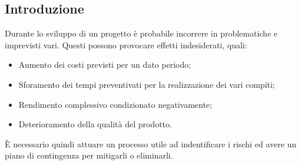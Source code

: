 \subsection{Introduzione}
    Durante lo sviluppo di un progetto è probabile incorrere in problematiche e imprevisti vari. Questi possono provocare effetti indesiderati, quali:
    \begin{itemize}
        \item Aumento dei costi previsti per un dato periodo; 
        \item Sforamento dei tempi preventivati per la realizzazione dei vari compiti; 
        \item Rendimento complessivo condizionato negativamente; 
        \item Deterioramento della qualità del prodotto. 
    \end{itemize}

    È necessario quindi attuare un processo utile ad indentificare i rischi ed avere un piano di contingenza per mitigarli o eliminarli. 